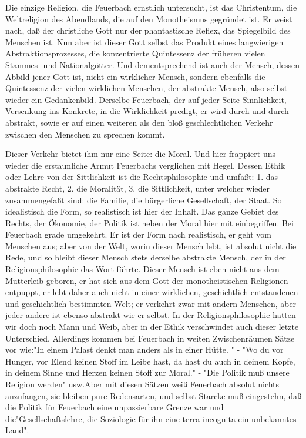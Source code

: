 Die einzige Religion, die Feuerbach ernstlich untersucht, ist
das Christentum, die Weltreligion des Abendlands, die auf den
Monotheismus gegründet ist. Er weist nach, daß der christliche Gott nur
der phantastische Reflex, das Spiegelbild des Menschen ist. Nun aber ist
dieser Gott selbst das Produkt eines langwierigen Abstraktionsprozesses,
die konzentrierte Quintessenz der früheren vielen Stammes- und
Nationalgötter. Und dementsprechend ist auch der Mensch, dessen Abbild
jener Gott ist, nicht ein wirklicher Mensch, sondern ebenfalls die
Quintessenz der vielen wirklichen Menschen, der abstrakte Mensch, also
selbst wieder ein Gedankenbild. Derselbe Feuerbach, der auf jeder Seite
Sinnlichkeit, Versenkung ins Konkrete, in die Wirklichkeit predigt, er
wird durch und durch abstrakt, sowie er auf einen weiteren als den bloß
geschlechtlichen Verkehr zwischen den Menschen zu sprechen kommt.

Dieser Verkehr bietet ihm nur eine Seite: die Moral. Und hier
frappiert uns wieder die erstaunliche Armut Feuerbachs verglichen mit
Hegel. Dessen Ethik oder Lehre von der Sittlichkeit ist die
Rechtsphilosophie und umfaßt: 1. das abstrakte Recht, 2. die Moralität,
3. die Sittlichkeit, unter welcher wieder zusammengefaßt sind: die
Familie, die bürgerliche Gesellschaft, der Staat. So idealistisch die
Form, so realistisch ist hier der Inhalt. Das ganze Gebiet des Rechts,
der Ökonomie, der Politik ist neben der Moral hier mit einbegriffen. Bei
Feuerbach grade umgekehrt. Er ist der Form nach realistisch, er geht vom
Menschen aus; aber von der Welt, worin dieser Mensch lebt, ist absolut
nicht die Rede, und so bleibt dieser Mensch stets derselbe abstrakte
Mensch, der in der Religionsphilosophie das Wort führte. Dieser Mensch
ist eben nicht aus dem Mutterleib geboren, er hat sich aus dem Gott der
monotheistischen Religionen entpuppt, er lebt daher auch nicht in einer
wirklichen, geschichtlich entstandenen und geschichtlich bestimmten
Welt; er verkehrt zwar mit andern Menschen, aber jeder andere ist ebenso
abstrakt wie er selbst. In der Religionsphilosophie hatten wir doch noch
Mann und Weib, aber in der Ethik verschwindet auch dieser letzte
Unterschied. Allerdings kommen bei Feuerbach in weiten Zwischenräumen
Sätze vor wie:"In einem Palast denkt man anders als in einer Hütte. " -
"Wo du vor Hunger, vor Elend keinen Stoff im Leibe hast, da hast du auch
in deinem Kopfe, in deinem Sinne und Herzen keinen Stoff zur Moral." -
"Die Politik muß unsere Religion werden" usw.Aber mit diesen Sätzen weiß
Feuerbach absolut nichts anzufangen, sie bleiben pure Redensarten, und
selbst Starcke muß eingestehn, daß die Politik für Feuerbach eine
unpassierbare Grenze war und die"Gesellschaftslehre, die Soziologie für
ihn eine terra incognita \textbar{}ein unbekanntes Land\textbar{}".

